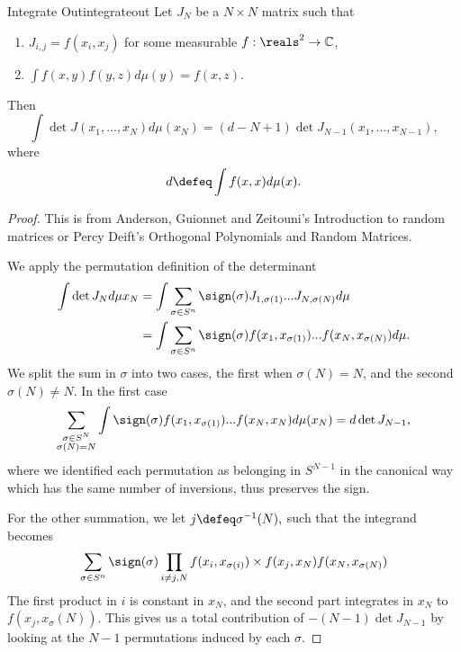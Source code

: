 \begin{alemma}{Integrate Out}{integrateout}
    Let $J_N$ be a $N\times N$ matrix such that \begin{enumerate}
        \item $J_{i,j} = f(x_i,x_j)$ for some measurable $f: \reals^2\to \mathbb{C}$,
        \item $\int f(x,y)f(y,z)d\mu(y) =f(x,z)$.
    \end{enumerate}
    Then \[
    \int \det J(x_1,...,x_N) d\mu(x_N) = (d-N+1) \det J_{N-1} (x_1,...,x_{N-1}),
    \]
    where \[
    d \defeq \int f(x,x) d\mu(x).
    \]
\end{alemma}
\begin{proof}
    This is from Anderson, Guionnet and Zeitouni's Introduction to random matrices or Percy Deift's Orthogonal Polynomials and Random Matrices. 

    We apply the permutation definition of the determinant \begin{align*}
        \int \det J_N d\mu x_N &= \int \sum_{\sigma \in S^n} \sign (\sigma) J_{1,\sigma(1)}...J_{N,\sigma(N)} d\mu \\
       &=  \int \sum_{\sigma \in S^n}\sign (\sigma)
        f(x_1,x_{\sigma(1)})...f(x_N,x_{\sigma(N)}) d\mu.
    \end{align*}
    We split the sum in $\sigma$ into two cases, the first when $\sigma(N)=N$, and the second $\sigma(N)\neq N$.
    In the first case \[
    \sum_{\substack{\sigma\in S^N\\ \sigma(N)=N}}\int
    \sign (\sigma) f(x_1,x_{\sigma(1)})...f(x_N,x_N) d\mu(x_N) = d \det J_{N-1},
    \]
    where we identified each permutation as belonging in $S^{N-1}$ in the canonical way which has the same number of inversions, thus preserves the sign. 

    For the other summation, we let $j \defeq \sigma^{-1}(N),$ such that the integrand becomes \[
    \sum_{\sigma \in S^n}\sign (\sigma) \prod_{i\neq j,N}
        f(x_i,x_{\sigma(i)}) \times f(x_j,x_N) f(x_N,x_{\sigma(N)})
    \]
    The first product in $i$ is constant in $x_N$, and the second part integrates in $x_N$ to $f(x_j, x_\sigma(N))$. This gives us a total contribution of $-(N-1)\det J_{N-1}$ by looking at the $N-1$ permutations induced by each $\sigma$.
\end{proof}


